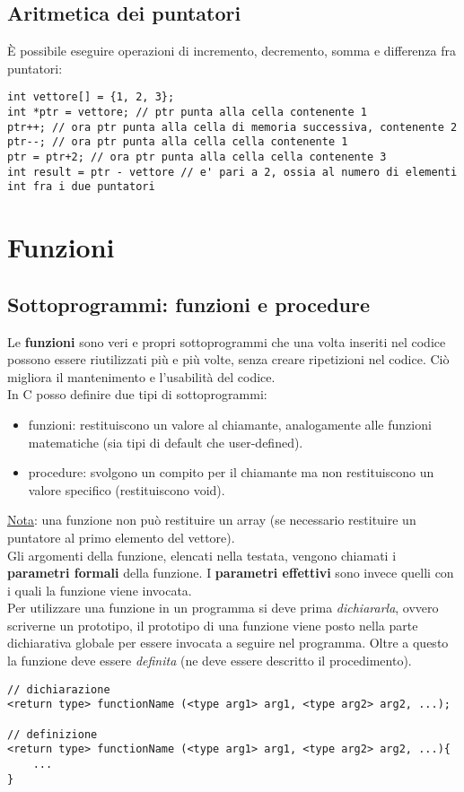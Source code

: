 \subsection{Aritmetica dei puntatori}
\`{E} possibile eseguire operazioni di incremento, decremento, somma e differenza fra puntatori:
\begin{lstlisting}[title = {Esempi sull'aritmetica dei puntatori}]
int vettore[] = {1, 2, 3};
int *ptr = vettore; // ptr punta alla cella contenente 1
ptr++; // ora ptr punta alla cella di memoria successiva, contenente 2
ptr--; // ora ptr punta alla cella cella contenente 1
ptr = ptr+2; // ora ptr punta alla cella cella contenente 3
int result = ptr - vettore // e' pari a 2, ossia al numero di elementi int fra i due puntatori

\end{lstlisting}

\section{Funzioni}\label{funzioni}
\subsection{Sottoprogrammi: funzioni e procedure}
Le \textbf{funzioni} sono veri e propri sottoprogrammi che una volta inseriti nel codice possono essere riutilizzati più e più volte, senza creare ripetizioni nel codice. Ciò migliora il mantenimento e l'usabilità del codice.\\
In C posso definire due tipi di sottoprogrammi: 
\begin{itemize}
	\item funzioni: restituiscono un valore al chiamante, analogamente alle funzioni matematiche (sia tipi di default che user-defined).
	\item procedure: svolgono un compito per il chiamante ma non restituiscono un valore specifico (restituiscono \colorbox{light-gray}{void}).
\end{itemize}
\underline{Nota}: una funzione non può restituire un array (se necessario restituire un puntatore al primo elemento del vettore).\\
Gli argomenti della funzione, elencati nella testata, vengono chiamati i \textbf{parametri formali} della funzione. I \textbf{parametri effettivi} sono invece quelli con i quali la funzione viene invocata.\\
Per utilizzare una funzione in un programma si deve prima \textit{dichiararla}, ovvero scriverne un prototipo, il prototipo di una funzione viene posto nella parte dichiarativa globale per essere invocata a seguire nel programma. Oltre a questo la funzione deve essere \textit{definita} (ne deve essere descritto il procedimento).  
\begin{lstlisting}[title={Dichiarazione di una funzione}]
// dichiarazione
<return type> functionName (<type arg1> arg1, <type arg2> arg2, ...);

// definizione
<return type> functionName (<type arg1> arg1, <type arg2> arg2, ...){
    ...
}
\end{lstlisting}

